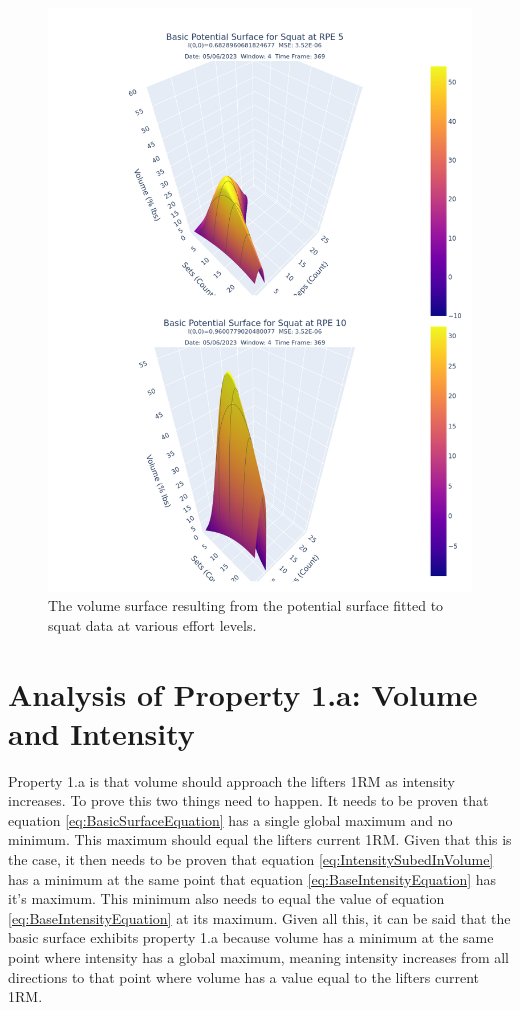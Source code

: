 \begin{figure}[htbp]
    \centering
    \includegraphics[scale=0.55]{images/ch3/Volume/DualSquat.Effort[5,10].basic.png}
    \caption{The volume surface resulting from the potential surface fitted to squat data at various effort levels.}
    \label{fig:SquatPotentialSurfaceVolumeAcrossEffort}
\end{figure}

\section{Analysis of Property 1.a: Volume and Intensity}
\label{sec:PotentialSurfaceAnalysisOfProperty1a}

Property 1.a is that volume should approach the lifters 1RM as intensity increases. To prove this two things need to happen. It needs to be proven that equation \ref{eq:BasicSurfaceEquation} has a single global maximum and no minimum. This maximum should equal the lifters current 1RM. Given that this is the case, it then needs to be proven that equation \ref{eq:IntensitySubedInVolume} has a  minimum at the same point that equation \ref{eq:BaseIntensityEquation} has it's maximum. This minimum also needs to equal the value of equation \ref{eq:BaseIntensityEquation} at its maximum. Given all this, it can be said that the basic surface exhibits property 1.a because volume has a minimum at the same point where intensity has a global maximum, meaning intensity increases from all directions to that point where volume has a value equal to the lifters current 1RM.

